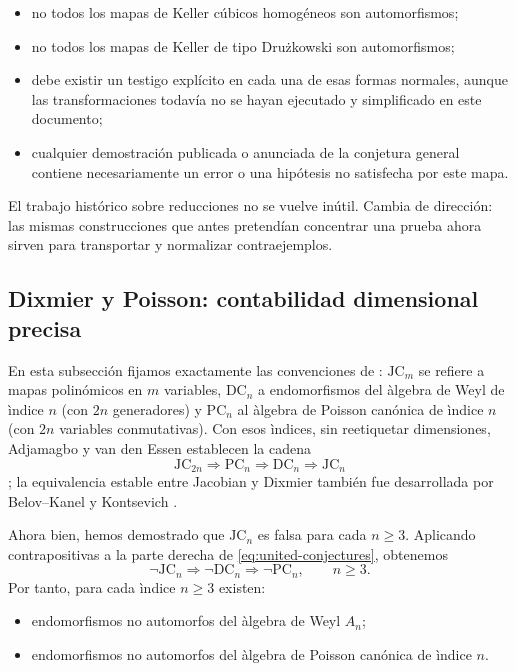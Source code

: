 \documentclass[11pt]{article}
\theoremstyle{definition}
\theoremstyle{remark}
\begin{document}
\begin{itemize}
\item no todos los mapas de Keller c\'ubicos homog\'eneos son automorfismos;
\item no todos los mapas de Keller de tipo Dru\.zkowski son automorfismos;
\item debe existir un testigo expl\'icito en cada una de esas formas normales,
aunque las transformaciones todav\'ia no se hayan ejecutado y simplificado en
este documento;
\item cualquier demostraci\'on publicada o anunciada de la conjetura general
contiene necesariamente un error o una hip\'otesis no satisfecha por este mapa.
\end{itemize}

El trabajo hist\'orico sobre reducciones no se vuelve in\'util. Cambia de
direcci\'on: las mismas construcciones que antes pretend\'ian concentrar una
prueba ahora sirven para transportar y normalizar contraejemplos.

\subsection{Dixmier y Poisson: contabilidad dimensional precisa}

En esta subsecci\'on fijamos exactamente las convenciones de
\cite{AdjamagboVanDenEssen2007}: $\mathrm{JC}_m$ se refiere a mapas
polin\'omicos en $m$ variables, $\mathrm{DC}_n$ a endomorfismos del \`algebra
de Weyl de \`indice $n$ (con $2n$ generadores) y $\mathrm{PC}_n$ al \`algebra
de Poisson can\'onica de \`indice $n$ (con $2n$ variables conmutativas). Con
esos \`indices, sin reetiquetar dimensiones, Adjamagbo y van den Essen
establecen la cadena
\begin{equation}\label{eq:united-conjectures}
\mathrm{JC}_{2n}\Longrightarrow
\mathrm{PC}_n\Longrightarrow
\mathrm{DC}_n\Longrightarrow
\mathrm{JC}_n
\end{equation}
\cite{AdjamagboVanDenEssen2007}; la equivalencia estable entre Jacobian y
Dixmier tambi\'en fue desarrollada por Belov--Kanel y Kontsevich
\cite{BelovKanelKontsevich2007}.

Ahora bien, hemos demostrado que $\mathrm{JC}_n$ es falsa para cada $n\geq3$.
Aplicando contrapositivas a la parte derecha de
\eqref{eq:united-conjectures}, obtenemos
\[
\neg\mathrm{JC}_n
\Longrightarrow
\neg\mathrm{DC}_n
\Longrightarrow
\neg\mathrm{PC}_n,
\qquad n\geq3.
\]
Por tanto, para cada \`indice $n\geq3$ existen:
\begin{itemize}
\item endomorfismos no automorfos del \`algebra de Weyl $A_n$;
\item endomorfismos no automorfos del \`algebra de Poisson can\'onica de
\`indice $n$.
\end{itemize}
\end{document}
